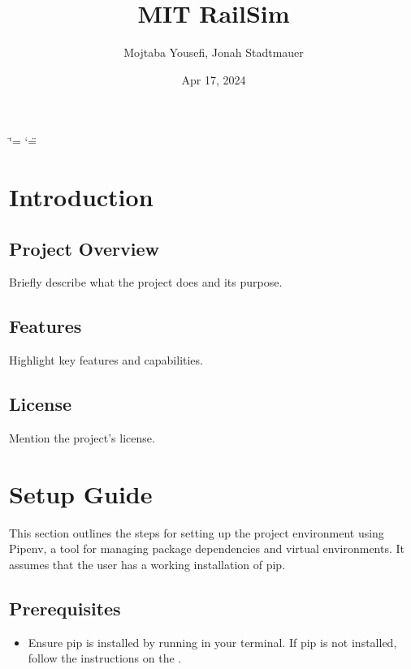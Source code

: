 \documentclass[letterpaper,10pt,english]{sphinxmanual}
\title{MIT RailSim}
\date{Apr 17, 2024}
\author{Mojtaba Yousefi, Jonah Stadtmauer}
\begin{document}
\ifdefined\shorthandoff
  \ifnum\catcode`\=\string=\active\shorthandoff{=}\fi
  \ifnum\catcode`\"=\active{}\fi
\fi

\pagestyle{empty}
\sphinxmaketitle
\pagestyle{plain}
\sphinxtableofcontents
\pagestyle{normal}
\label{\detokenize{index::doc}}


\sphinxstepscope


\chapter{Introduction}
\label{\detokenize{introduction:introduction}}\label{\detokenize{introduction::doc}}

\section{Project Overview}
\label{\detokenize{introduction:project-overview}}
\sphinxAtStartPar
Briefly describe what the project does and its purpose.


\section{Features}
\label{\detokenize{introduction:features}}
\sphinxAtStartPar
Highlight key features and capabilities.


\section{License}
\label{\detokenize{introduction:license}}
\sphinxAtStartPar
Mention the project’s license.

\sphinxstepscope


\chapter{Setup Guide}
\label{\detokenize{setup_guide:setup-guide}}\label{\detokenize{setup_guide::doc}}
\sphinxAtStartPar
This section outlines the steps for setting up the project environment using Pipenv, a tool for managing package dependencies and virtual environments. It assumes that the user has a working installation of pip.


\section{Prerequisites}
\label{\detokenize{setup_guide:prerequisites}}\begin{itemize}
\item {} 
\sphinxAtStartPar
Ensure pip is installed by running  in your terminal. If pip is not installed, follow the instructions on the .

\end{itemize}
\end{document}
